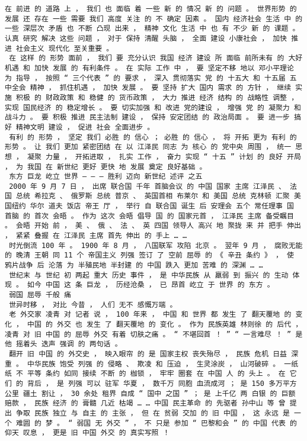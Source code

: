 \documentclass{article}
\begin{document}
\begin{Verbatim}[commandchars=\\\{\}]
 在 前进 的 道路 上 ， 我们 也 面临 着 一些 新 的 情况 新 的 问题 。 世界形势 的 发展 还 存在 一些 需要 我们 高度 关注 的 不 确定 因素 。 国内 经济社会 生活 中 的 一些 深层次 矛盾 也 不断 凸现 出来 ， 精神 文化 生活 中 也 有 不少 新 的 课题 。 认真 研究 解决 这些 问题 ， 对于 保持 清醒 头脑 ， 全面 建设 小康社会 ， 加快 推进 社会主义 现代化 至关重要 。 
 在 这样 的 形势 面前 ， 我们 要 充分认识 我国 经济 建设 所 面临 前所未有 的 大好 机遇 和 加快 发展 的 有利条件 。 在 实际 工作 中 ， 要 坚定不移 地以 邓小平理论 为 指导 ， 按照 “ 三个代表 ” 的 要求 ， 深入 贯彻落实 党 的 十五大 和 十五届 五中全会 精神 ， 抓住机遇 ， 加快 发展 。 要 坚持 扩大 国内 需求 的 方针 ， 继续 实施 积极 的 财政政策 和 稳健 的 货币政策 ， 大力 推进 经济 结构 的 战略性 调整 ， 实现 国民经济 的 稳定增长 。 要 切实加强 和 改进 党的建设 ， 增强 党 的 凝聚力 和 战斗力 。 要 积极 推进 民主法制 建设 ， 保持 安定团结 的 政治局面 。 要 进一步 搞好 精神文明 建设 ， 促进 社会 全面进步 。 
 有利 的 形势 ， 坚定 我们 必胜 的 信心 ； 必胜 的 信心 ， 将 开拓 更为 有利 的 形势 。 让 我们 更加 紧密团结 在 以 江泽民 同志 为 核心 的 党中央 周围 ， 统一 思想 ， 凝聚 力量 ， 开拓进取 ， 扎实 工作 ， 奋力 实现 “ 十五 ” 计划 的 良好 开局 ， 为 我国 在 新世纪 更好 更快 地 发展 奠定 良好基础 。 
 东方 巨龙 屹立 世界 — — — 胜利 迈向 新世纪 述评 之五 
 2000 年 9 月 7 日 ， 出席 联合国 千年 首脑会议 的 中国 国家 主席 江泽民 、 法国 总统 希拉克 、 俄罗斯 总统 普京 、 英国首相 布莱尔 和 美国 总统 克林顿 汇聚 美国纽约 华尔 道夫 饭店 帝王 厅 ， 举行 自 联合国 诞生 后 安理会 五个 常任理事 国 首脑 的 首次 会晤 。 作为 这次 会晤 倡导 国 的 国家元首 ， 江泽民 主席 备受瞩目 。 会晤 开始 前 ， 美 、 俄 、 法 、 英 四国 领导人 高兴 地 聚拢 来 并 把手 伸出 ， 紧紧 叠握 在 江泽民 主席 首先 伸出 的 手上 … … 
 时光倒流 100 年 。 1900 年 8 月 ， 八国联军 攻陷 北京 。 翌年 9 月 ， 腐败无能 的 晚清 王朝 同 11 个 帝国主义 列强 签订 了 空前 屈辱 的 《 辛丑 条约 》 ， 使 鸦片战争 后 沦落 为 半殖民地 半封建 的 中国 跌入 更加 苦难 的 深渊 … … 
 世纪末 与 世纪 初 两起 重大 历史 事件 ， 是 中华民族 从 羸弱 到 振兴 的 生动 体现 。 如今 中国 这 条 巨龙 ， 历经沧桑 ， 已 昂首 屹立 于 世界 的 东方 。 
 弱国 屈辱 千般 痛 
 世异时移 ， 对比 今昔 ， 人们 无不 感慨万端 。 
 老 外交家 凌青 对 记者 说 ， 100 年来 ， 中国 和 世界 都 发生 了 翻天覆地 的 变化 ， 中国 的 外交 也 发生 了 翻天覆地 的 变化 。 作为 民族英雄 林则徐 的 后代 ， 凌青 对 旧 中国 的 屈辱 外交 有着 切肤之痛 。 “ 不堪回首 ！ ” “ 一言难尽 ！ ” 是 他 摇着头 迭声 强调 的 两句话 。 
 翻开 旧 中国 的 外交史 ， 映入眼帘 的 是 国家主权 丧失殆尽 ， 民族 危机 日益 深重 。 中华民族 饱受 列强 的 侵略 、 欺凌 和 压迫 ， 生灵涂炭 ， 山河破碎 。 一纸 纸 不 平等 条约 如同 接续 不断 的 枷锁 ， 牢牢 圈套 在 中国 人 的 头上 。 在 它们 的 背后 ， 是 列强 可以 驻军 华夏 ， 数千万 同胞 血流成河 ； 是 150 多万平方公里 疆土 割让 ， 30 余处 租界 自成 “ 国中 之国 ” ； 是 上千亿 两 白银 的 巨额 赔款 ， 民族 经济 的 膏髓 几近 枯竭 … … 中国 民主革命 的 先驱者 孙中山 等 曾 提出 争取 民族 独立 与 自主 的 主张 ， 但 在 贫弱 交加 的 旧 中国 ， 这 永远 是 一个 难圆 的 梦 。 “ 弱国 无 外交 ” ， 不 只是 参加 “ 巴黎和会 ” 的 中国 代表 的 仰天 叹息 ， 更是 旧 中国 外交 的 真实写照 ！ 

\end{Verbatim}
\end{document}
